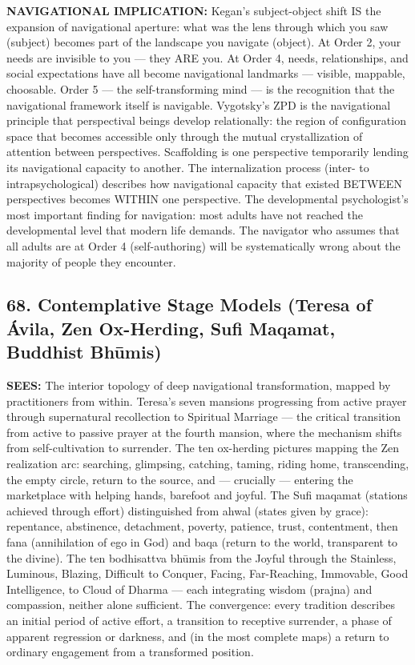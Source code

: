 \textbf{NAVIGATIONAL IMPLICATION:} Kegan's subject-object shift IS the expansion of navigational aperture: what was the lens through which you saw (subject) becomes part of the landscape you navigate (object). At Order 2, your needs are invisible to you — they ARE you. At Order 4, needs, relationships, and social expectations have all become navigational landmarks — visible, mappable, choosable. Order 5 — the self-transforming mind — is the recognition that the navigational framework itself is navigable. Vygotsky's ZPD is the navigational principle that perspectival beings develop relationally: the region of configuration space that becomes accessible only through the mutual crystallization of attention between perspectives. Scaffolding is one perspective temporarily lending its navigational capacity to another. The internalization process (inter- to intrapsychological) describes how navigational capacity that existed BETWEEN perspectives becomes WITHIN one perspective. The developmental psychologist's most important finding for navigation: most adults have not reached the developmental level that modern life demands. The navigator who assumes that all adults are at Order 4 (self-authoring) will be systematically wrong about the majority of people they encounter.


\bigskip\noindent\makebox[\textwidth]{\color{rulegray}\rule{5cm}{0.3pt}}\bigskip


\subsection*{68. Contemplative Stage Models (Teresa of Ávila, Zen Ox-Herding, Sufi Maqamat, Buddhist Bhūmis)}


\textbf{SEES:} The interior topology of deep navigational transformation, mapped by practitioners from within. Teresa's seven mansions progressing from active prayer through supernatural recollection to Spiritual Marriage — the critical transition from active to passive prayer at the fourth mansion, where the mechanism shifts from self-cultivation to surrender. The ten ox-herding pictures mapping the Zen realization arc: searching, glimpsing, catching, taming, riding home, transcending, the empty circle, return to the source, and — crucially — entering the marketplace with helping hands, barefoot and joyful. The Sufi maqamat (stations achieved through effort) distinguished from ahwal (states given by grace): repentance, abstinence, detachment, poverty, patience, trust, contentment, then fana (annihilation of ego in God) and baqa (return to the world, transparent to the divine). The ten bodhisattva bhūmis from the Joyful through the Stainless, Luminous, Blazing, Difficult to Conquer, Facing, Far-Reaching, Immovable, Good Intelligence, to Cloud of Dharma — each integrating wisdom (prajna) and compassion, neither alone sufficient. The convergence: every tradition describes an initial period of active effort, a transition to receptive surrender, a phase of apparent regression or darkness, and (in the most complete maps) a return to ordinary engagement from a transformed position.



